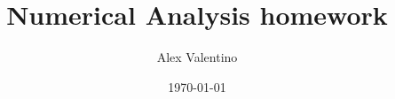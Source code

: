 \documentclass[12pt, letterpaper]{article}
\date{\today}
\author{Alex Valentino}
\title{Numerical Analysis homework}
\begin{document}
\begin{enumerate}

\end{enumerate}
\end{document}
